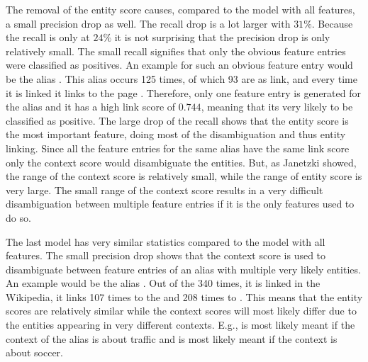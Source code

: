 The removal of the entity score causes, compared to the model with all features, a small precision drop as well. The recall drop is a lot larger with $31\%$. Because the recall is only at $24\%$ it is not surprising that the precision drop is only relatively small. The small recall signifies that only the obvious feature entries were classified as positives. An example for such an obvious feature entry would be the alias . This alias occurs 125 times, of which 93 are as link, and every time it is linked it links to the page . Therefore, only one feature entry is generated for the alias and it has a high link score of $0.744$, meaning that its very likely to be classified as positive. The large drop of the recall shows that the entity score is the most important feature, doing most of the disambiguation and thus entity linking. Since all the feature entries for the same alias have the same link score only the context score would disambiguate the entities. But, as Janetzki \cite{janetzki} showed, the range of the context score is relatively small, while the range of entity score is very large. The small range of the context score results in a very difficult disambiguation between multiple feature entries if it is the only features used to do so.\par
The last model has very similar statistics compared to the model with all features. The small precision drop shows that the context score is used to disambiguate between feature entries of an alias with multiple very likely entities. An example would be the alias . Out of the 340 times, it is linked in the Wikipedia, it links 107 times to the  and 208 times to . This means that the entity scores are relatively similar while the context scores will most likely differ due to the entities appearing in very different contexts. E.g.,  is most likely meant if the context of the alias is about traffic and  is most likely meant if the context is about soccer.\par


